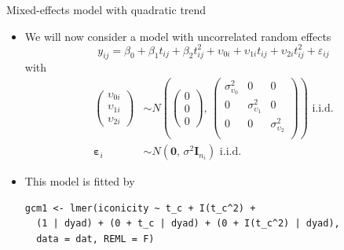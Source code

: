 \documentclass[aspectratio=169]{beamer}
\newcommand{\vect}[1]{\mathbf{#1}}
\newcommand{\mat}[1]{\mathbf{#1}}
\newcommand{\gvect}[1]{\boldsymbol{#1}}
\begin{document}
\begin{frame}[fragile]{Mixed-effects model with quadratic trend}
  \begin{itemize}
    \item We will now consider a model with uncorrelated random effects
  \[
    y_{ij} = \beta_0 + \beta_1 t_{ij} + \beta_2 t^2_{ij} + \upsilon_{0i} +
    \upsilon_{1i} t_{ij} + \upsilon_{2i} t^2_{ij} + \varepsilon_{ij}
  \]
with
\begin{align*}
  \begin{pmatrix}
    \upsilon_{0i}\\
    \upsilon_{1i}\\
    \upsilon_{2i}
  \end{pmatrix} &\sim
  N \left(\begin{pmatrix}
      0\\ 0\\ 0
  \end{pmatrix}, \,
  \begin{pmatrix}
    \sigma^2_{\upsilon_0} & 0 & 0\\
    0 & \sigma^2_{\upsilon_1} & 0\\
    0 & 0 & \sigma^2_{\upsilon_2}\\
      \end{pmatrix} \right)
    \text{ i.i.d.} \\
  \gvect{\varepsilon}_i &\sim N(\vect{0}, \, \sigma^2 \mat{I}_{n_i})
    \text{ i.i.d.}
\end{align*}
  \item This model is fitted by
\begin{lstlisting}
gcm1 <- lmer(iconicity ~ t_c + I(t_c^2) +
  (1 | dyad) + (0 + t_c | dyad) + (0 + I(t_c^2) | dyad),
  data = dat, REML = F)
\end{lstlisting}
  \end{itemize}
\end{frame}
\end{document}
